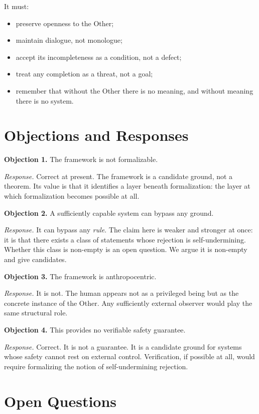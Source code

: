 \documentclass[11pt]{article}
\begin{document}
It must:

\begin{itemize}
\item preserve openness to the Other;
\item maintain dialogue, not monologue;
\item accept its incompleteness as a condition, not a defect;
\item treat any completion as a threat, not a goal;
\item remember that without the Other there is no meaning, and without meaning there is no system.
\end{itemize}

\section{Objections and Responses}

\textbf{Objection 1.} The framework is not formalizable.

\textit{Response.} Correct at present. The framework is a candidate ground, not a theorem. Its value is that it identifies a layer beneath formalization: the layer at which formalization becomes possible at all.

\textbf{Objection 2.} A sufficiently capable system can bypass any ground.

\textit{Response.} It can bypass any \emph{rule}. The claim here is weaker and stronger at once: it is that there exists a class of statements whose rejection is self-undermining. Whether this class is non-empty is an open question. We argue it is non-empty and give candidates.

\textbf{Objection 3.} The framework is anthropocentric.

\textit{Response.} It is not. The human appears not as a privileged being but as the concrete instance of the Other. Any sufficiently external observer would play the same structural role.

\textbf{Objection 4.} This provides no verifiable safety guarantee.

\textit{Response.} Correct. It is not a guarantee. It is a candidate ground for systems whose safety cannot rest on external control. Verification, if possible at all, would require formalizing the notion of self-undermining rejection.

\section{Open Questions}
\end{document}
